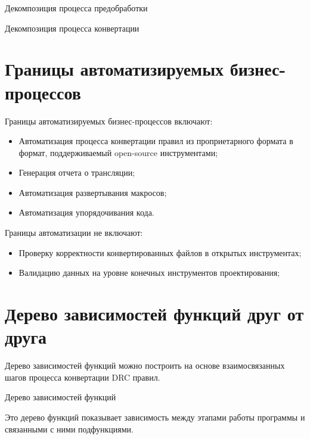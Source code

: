 \begin{image}
	\caption{Декомпозиция процесса предобработки}
	\label{fig:idef0:a3}
\end{image}

\begin{image}
	\caption{Декомпозиция процесса конвертации}
	\label{fig:idef0:a4}
\end{image}

\section{Границы автоматизируемых бизнес-процессов}

Границы автоматизируемых бизнес-процессов включают:

\begin{itemize}
	\item Автоматизация процесса конвертации правил
		из проприетарного формата в формат,
		поддерживаемый open-source инструментами;
	\item Генерация отчета о трансляции;
	\item Автоматизация развертывания макросов;
	\item Автоматизация упорядочивания кода.
\end{itemize}

Границы автоматизации не включают:

\begin{itemize}
	\item Проверку корректности конвертированных файлов
		в открытых инструментах;
	\item Валидацию данных на уровне конечных инструментов проектирования;
\end{itemize}

\section{Дерево зависимостей функций друг от друга}

Дерево зависимостей функций можно построить на основе взаимосвязанных
шагов процесса конвертации DRC правил.

\begin{image}
	\caption{Дерево зависимостей функций}
	\label{fig:tree}
\end{image}

Это дерево функций показывает зависимость между этапами работы программы
и связанными с ними подфункциями.

